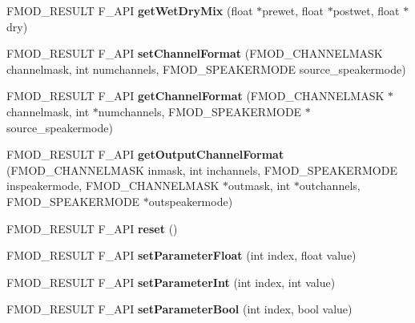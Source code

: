 \begin{DoxyCompactItemize}
F\+M\+O\+D\+\_\+\+R\+E\+S\+U\+LT F\+\_\+\+A\+PI {\bfseries get\+Wet\+Dry\+Mix} (float $\ast$prewet, float $\ast$postwet, float $\ast$dry)
\item 
\mbox{\label{classFMOD_1_1DSP_a1cf7028a5dad21c9b25b0a1c740d9fa2}} 
F\+M\+O\+D\+\_\+\+R\+E\+S\+U\+LT F\+\_\+\+A\+PI {\bfseries set\+Channel\+Format} (F\+M\+O\+D\+\_\+\+C\+H\+A\+N\+N\+E\+L\+M\+A\+SK channelmask, int numchannels, F\+M\+O\+D\+\_\+\+S\+P\+E\+A\+K\+E\+R\+M\+O\+DE source\+\_\+speakermode)
\item 
\mbox{\label{classFMOD_1_1DSP_af8188037563561808d0b4f6b5e1034aa}} 
F\+M\+O\+D\+\_\+\+R\+E\+S\+U\+LT F\+\_\+\+A\+PI {\bfseries get\+Channel\+Format} (F\+M\+O\+D\+\_\+\+C\+H\+A\+N\+N\+E\+L\+M\+A\+SK $\ast$channelmask, int $\ast$numchannels, F\+M\+O\+D\+\_\+\+S\+P\+E\+A\+K\+E\+R\+M\+O\+DE $\ast$source\+\_\+speakermode)
\item 
\mbox{\label{classFMOD_1_1DSP_a51940a26a921a03694ace53f63a92e22}} 
F\+M\+O\+D\+\_\+\+R\+E\+S\+U\+LT F\+\_\+\+A\+PI {\bfseries get\+Output\+Channel\+Format} (F\+M\+O\+D\+\_\+\+C\+H\+A\+N\+N\+E\+L\+M\+A\+SK inmask, int inchannels, F\+M\+O\+D\+\_\+\+S\+P\+E\+A\+K\+E\+R\+M\+O\+DE inspeakermode, F\+M\+O\+D\+\_\+\+C\+H\+A\+N\+N\+E\+L\+M\+A\+SK $\ast$outmask, int $\ast$outchannels, F\+M\+O\+D\+\_\+\+S\+P\+E\+A\+K\+E\+R\+M\+O\+DE $\ast$outspeakermode)
\item 
\mbox{\label{classFMOD_1_1DSP_ae475150cbc68d5ad5e5be5791ec3961a}} 
F\+M\+O\+D\+\_\+\+R\+E\+S\+U\+LT F\+\_\+\+A\+PI {\bfseries reset} ()
\item 
\mbox{\label{classFMOD_1_1DSP_a19bab08a4e41005148f14c1db2040f72}} 
F\+M\+O\+D\+\_\+\+R\+E\+S\+U\+LT F\+\_\+\+A\+PI {\bfseries set\+Parameter\+Float} (int index, float value)
\item 
\mbox{\label{classFMOD_1_1DSP_a25fb620fbbca3f4749f891033459f99e}} 
F\+M\+O\+D\+\_\+\+R\+E\+S\+U\+LT F\+\_\+\+A\+PI {\bfseries set\+Parameter\+Int} (int index, int value)
\item 
\mbox{\label{classFMOD_1_1DSP_aed896ed8f8d3998ce2fcdec70638a135}} 
F\+M\+O\+D\+\_\+\+R\+E\+S\+U\+LT F\+\_\+\+A\+PI {\bfseries set\+Parameter\+Bool} (int index, bool value)

\end{DoxyCompactItemize}
